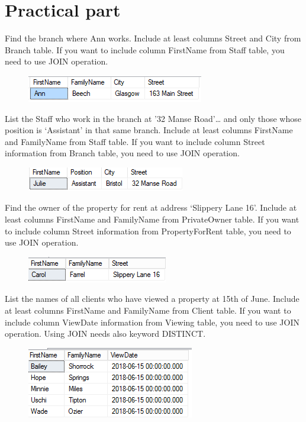 \documentclass[12pt,a4paper]{article}
\begin{document}
\section{Practical part}
Find the branch where Ann works. Include at least columns Street and City
from Branch table. If you want to include column FirstName from Staff table,
you need to use JOIN operation.
\begin{figure}[hbtp]
	\includegraphics[scale=1]{1-Ann-branch.PNG}
	\end{figure}
List the Staff who work in the branch at ’32 Manse Road’… and only those
whose position is ‘Assistant’ in that same branch. Include at least columns
FirstName and FamilyName from Staff table. If you want to include column
Street information from Branch table, you need to use JOIN operation.
\begin{figure}[hbtp]
	\includegraphics[scale=1]{2-branch-position.PNG}
	\end{figure}
Find the owner of the property for rent at address ‘Slippery Lane 16’.
Include at least columns FirstName and FamilyName from PrivateOwner
table. If you want to include column Street information from PropertyForRent
table, you need to use JOIN operation.
\begin{figure}[hbtp]
	\includegraphics[scale=1]{3-owner-street.PNG}
	\end{figure}
List the names of all clients who have viewed a property at 15th of June.
Include at least columns FirstName and FamilyName from Client table. If you
want to include column ViewDate information from Viewing table, you need to
use JOIN operation. Using JOIN needs also keyword DISTINCT.
\begin{figure}[hbtp]
	\includegraphics[scale=1]{4-viewdate.PNG}
	\end{figure}
\end{document}
